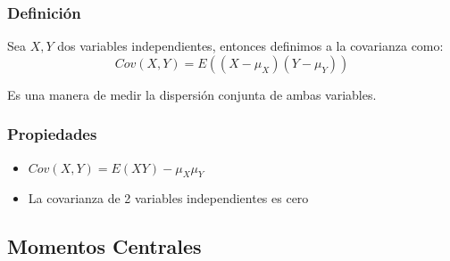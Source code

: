 \documentclass[12pt, fleqn]{report}                             %
\theoremstyle{break}                                            %
\newcommand{\Wrap}[1]{\left( #1 \right)}                        %
\begin{document}
                \subsubsection{Definición}

                    Sea $X, Y$ dos variables independientes, entonces
                    definimos a la covarianza como:
                    \begin{equation*}
                        Cov(X, Y)
                            = E\Wrap{(X - \mu_{X})(Y - \mu_{Y})}
                    \end{equation*}

                    Es una manera de medir la dispersión conjunta de ambas variables.



                
                \subsubsection{Propiedades}

                    \begin{itemize}

                        \item 
                            $Cov(X, Y) = E(X Y) - \mu_{X}\mu_{Y}$


                        \item La covarianza de 2 variables independientes es cero

                                
                    \end{itemize}




            \clearpage
            \subsection{Momentos Centrales}
\end{document}
